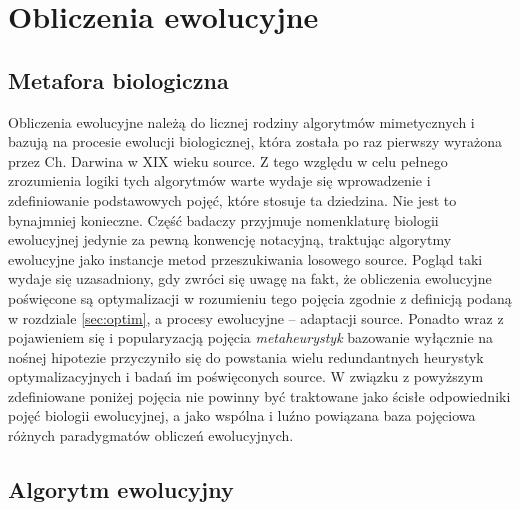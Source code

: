 \newpage
\section{Obliczenia ewolucyjne}
\label{sec:ewol}
\subsection{Metafora biologiczna}

    Obliczenia ewolucyjne należą do licznej rodziny algorytmów mimetycznych i bazują na
    procesie ewolucji biologicznej, która została po raz pierwszy wyrażona przez Ch. Darwina w XIX wieku {source}. Z tego względu w celu pełnego zrozumienia logiki tych algorytmów warte wydaje się wprowadzenie i zdefiniowanie podstawowych pojęć, które stosuje ta dziedzina. 
    Nie jest to bynajmniej konieczne. Część badaczy przyjmuje nomenklaturę biologii ewolucyjnej jedynie za pewną konwencję notacyjną, traktując algorytmy ewolucyjne jako instancje metod przeszukiwania losowego {source}. Pogląd taki wydaje się uzasadniony, gdy zwróci się uwagę na fakt, że obliczenia ewolucyjne poświęcone są optymalizacji w rozumieniu tego pojęcia zgodnie z definicją podaną w rozdziale \ref{sec:optim}, a procesy ewolucyjne -- adaptacji {source}.
    Ponadto wraz z pojawieniem się i popularyzacją pojęcia \textit{metaheurystyk} bazowanie wyłącznie na nośnej hipotezie przyczyniło się do powstania wielu redundantnych heurystyk optymalizacyjnych i badań im poświęconych {source}.
    W związku z powyższym zdefiniowane poniżej pojęcia nie powinny być traktowane jako ścisłe odpowiedniki pojęć biologii ewolucyjnej, a jako wspólna i luźno powiązana baza pojęciowa różnych paradygmatów obliczeń ewolucyjnych.
    
\subsection{Algorytm ewolucyjny}


